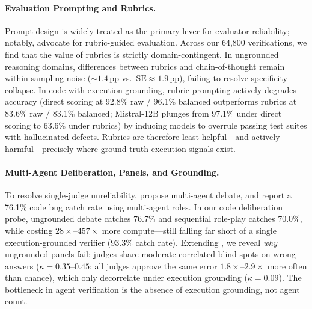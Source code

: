\paragraph{Evaluation Prompting and Rubrics.}
Prompt design is widely treated as the primary lever for evaluator reliability; notably, \citet{kim2023prometheus} advocate for rubric-guided evaluation. Across our 64{,}800 verifications, we find that the value of rubrics is strictly domain-contingent. In ungrounded reasoning domains, differences between rubrics and chain-of-thought remain within sampling noise ($\sim 1.4$\,pp vs.\ $\text{SE} \approx 1.9$\,pp), failing to resolve specificity collapse. In code with execution grounding, rubric prompting actively degrades accuracy (direct scoring at 92.8\% raw / 96.1\% balanced outperforms rubrics at 83.6\% raw / 83.1\% balanced; Mistral-12B plunges from 97.1\% under direct scoring to 63.6\% under rubrics) by inducing models to overrule passing test suites with hallucinated defects. Rubrics are therefore least helpful—and actively harmful—precisely where ground-truth execution signals exist.

\paragraph{Multi-Agent Deliberation, Panels, and Grounding.}
To resolve single-judge unreliability, \citet{chan2024chateval} propose multi-agent debate, and \citet{rajan2025codexverify} report a 76.1\% code bug catch rate using multi-agent roles. In our code deliberation probe, ungrounded debate catches 76.7\% and sequential role-play catches 70.0\%, while costing $28\times\text{--}457\times$ more compute—still falling far short of a single execution-grounded verifier (93.3\% catch rate). Extending \citet{verga2024replacing}, we reveal \emph{why} ungrounded panels fail: judges share moderate correlated blind spots on wrong answers ($\kappa = 0.35\text{--}0.45$; all judges approve the same error $1.8\times\text{--}2.9\times$ more often than chance), which only decorrelate under execution grounding ($\kappa = 0.09$). The bottleneck in agent verification is the absence of execution grounding, not agent count.

